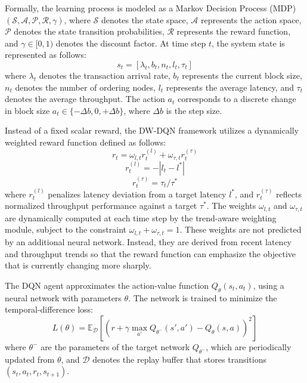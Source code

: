 \documentclass[a4paper,fleqn]{cas-dc}
\begin{document}
Formally, the learning process is modeled as a Markov Decision Process (MDP) $(\mathcal{S}, \mathcal{A}, \mathcal{P}, \mathcal{R}, \gamma)$, where $\mathcal{S}$ denotes the state space, $\mathcal{A}$ represents the action space, $\mathcal{P}$ denotes the state transition probabilities, $\mathcal{R}$ represents the reward function, and $\gamma \in [0,1)$ denotes the discount factor. At time step $t$, the system state is represented as follows:
\begin{equation}
	s_t = [\lambda_t, b_t, n_t, l_t, \tau_t]
\end{equation}
where $\lambda_t$ denotes the transaction arrival rate, $b_t$ represents the current block size, $n_t$ denotes the number of ordering nodes, $l_t$ represents the average latency, and $\tau_t$ denotes the average throughput. The action $a_t$ corresponds to a discrete change in block size $a_t \in \{-\Delta b, 0, +\Delta b\}$, where $\Delta b$ is the step size.

Instead of a fixed scalar reward, the DW-DQN framework utilizes a dynamically weighted reward function defined as follows:
\begin{equation}
	r_t = \omega_{l,t} r_t^{(l)} + \omega_{\tau,t} r_t^{(\tau)}
\end{equation}
\begin{equation}
	r_t^{(l)} = -|l_t - l^*|
\end{equation}
\begin{equation}
	r_t^{(\tau)} = \tau_t / \tau^*
\end{equation}
where $r_t^{(l)}$ penalizes latency deviation from a target latency $l^*$, and $r_t^{(\tau)}$ reflects normalized throughput performance against a target $\tau^*$. The weights $\omega_{l,t}$ and $\omega_{\tau,t}$ are dynamically computed at each time step by the trend-aware weighting module, subject to the constraint $\omega_{l,t} + \omega_{\tau,t} = 1$. These weights are not predicted by an additional neural network. Instead, they are derived from recent latency and throughput trends so that the reward function can emphasize the objective that is currently changing more sharply.

The DQN agent approximates the action-value function $Q_\theta(s_t, a_t)$, using a neural network with parameters $\theta$. The network is trained to minimize the temporal-difference loss:
\begin{equation}
	L(\theta)=\mathbb{E}_{\mathcal{D}}\left[\left(r+\gamma\max_{a'}Q_{\theta^-}(s',a')-Q_\theta(s,a)\right)^2\right]
\end{equation}
where $\theta^-$ are the parameters of the target network $Q_{\theta^-}$, which are periodically updated from $\theta$, and $\mathcal{D}$ denotes the replay buffer that stores transitions $(s_t, a_t, r_t, s_{t+1})$.
\end{document}
